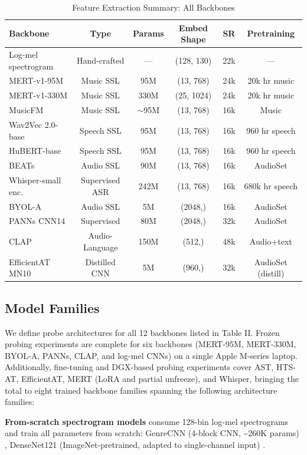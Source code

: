 \documentclass[conference]{IEEEtran}
\begin{document}
\begin{table}[t]
\centering
\caption{Feature Extraction Summary: All Backbones}
\label{tab:backbones}
\footnotesize
\begin{tabular}{lccccc}
\toprule
\textbf{Backbone} & \textbf{Type} & \textbf{Params} & \textbf{Embed Shape} & \textbf{SR} & \textbf{Pretraining} \\
\midrule
Log-mel spectrogram & Hand-crafted & --- & (128, 130) & 22k & --- \\
MERT-v1-95M & Music SSL & 95M & (13, 768) & 24k & 20k hr music \\
MERT-v1-330M & Music SSL & 330M & (25, 1024) & 24k & 20k hr music \\
MusicFM & Music SSL & $\sim$95M & (13, 768) & 16k & Music \\
Wav2Vec 2.0-base & Speech SSL & 95M & (13, 768) & 16k & 960 hr speech \\
HuBERT-base & Speech SSL & 95M & (13, 768) & 16k & 960 hr speech \\
BEATs & Audio SSL & 90M & (13, 768) & 16k & AudioSet \\
Whisper-small enc. & Supervised ASR & 242M & (13, 768) & 16k & 680k hr speech \\
BYOL-A & Audio SSL & 5M & (2048,) & 16k & AudioSet \\
PANNs CNN14 & Supervised & 80M & (2048,) & 32k & AudioSet \\
CLAP & Audio-Language & 150M & (512,) & 48k & Audio+text \\
EfficientAT MN10 & Distilled CNN & 5M & (960,) & 32k & AudioSet (distill) \\
\bottomrule
\end{tabular}
\end{table}

\subsection{Model Families}\label{e.-model-families}

We define probe architectures for all 12 backbones listed in Table II.
Frozen probing experiments are complete for six backbones (MERT-95M,
MERT-330M, BYOL-A, PANNs, CLAP, and log-mel CNNs) on a single Apple
M-series laptop. Additionally, fine-tuning and DGX-based probing
experiments cover AST, HTS-AT, EfficientAT, MERT (LoRA and partial
unfreeze), and Whisper, bringing the total to eight trained backbone
families spanning the following architecture families:

\textbf{From-scratch spectrogram models} consume 128-bin log-mel
spectrograms and train all parameters from scratch: GenreCNN (4-block
CNN, \textasciitilde260K params) \citep{choi2017transfer}, DenseNet121
(ImageNet-pretrained, adapted to single-channel input)
\citep{huang2017densenet, bian2019audio}.
\end{document}
